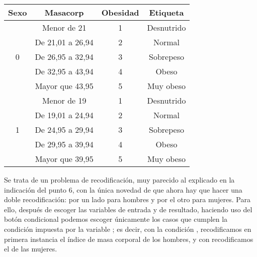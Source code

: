 \documentclass[a4paper]{article}
\begin{document}
\begin{enumerate}
\begin{center}
\begin{tabular}{|l|l|l|l|}
\hline
\multicolumn{1}{|c|}{Sexo} & \multicolumn{1}{c|}{Masacorp} & \multicolumn{1}{c|}{Obesidad} & \multicolumn{1}{c|}{Etiqueta} \\
\hline
\multicolumn{1}{|c|}{} & \multicolumn{1}{c|}{Menor de 21} & \multicolumn{1}{c|}{1} & \multicolumn{1}{c|}{Desnutrido} \\
\cline{2-4}
\multicolumn{1}{|c|}{} & \multicolumn{1}{c|}{De 21,01 a 26,94} & \multicolumn{1}{c|}{2} & \multicolumn{1}{c|}{Normal} \\
\cline{2-4}
\multicolumn{1}{|c|}{0} & \multicolumn{1}{c|}{De 26,95 a 32,94} & \multicolumn{1}{c|}{3} & \multicolumn{1}{c|}{Sobrepeso} \\
\cline{2-4}
\multicolumn{1}{|c|}{} & \multicolumn{1}{c|}{De 32,95 a 43,94} & \multicolumn{1}{c|}{4} & \multicolumn{1}{c|}{Obeso} \\
\cline{2-4}
\multicolumn{1}{|c|}{} & \multicolumn{1}{c|}{Mayor que 43,95} & \multicolumn{1}{c|}{5} & \multicolumn{1}{c|}{Muy obeso} \\
\hline
\multicolumn{1}{|c|}{} & \multicolumn{1}{c|}{Menor de 19} & \multicolumn{1}{c|}{1} & \multicolumn{1}{c|}{Desnutrido} \\
\cline{2-4}
\multicolumn{1}{|c|}{} & \multicolumn{1}{c|}{De 19,01 a 24,94} & \multicolumn{1}{c|}{2} & \multicolumn{1}{c|}{Normal} \\
\cline{2-4}
\multicolumn{1}{|c|}{1} & \multicolumn{1}{c|}{De 24,95 a 29,94} & \multicolumn{1}{c|}{3} & \multicolumn{1}{c|}{Sobrepeso} \\
\cline{2-4}
\multicolumn{1}{|c|}{} & \multicolumn{1}{c|}{De 29,95 a 39,94} & \multicolumn{1}{c|}{4} & \multicolumn{1}{c|}{Obeso} \\
\cline{2-4}
\multicolumn{1}{|c|}{} & \multicolumn{1}{c|}{Mayor que 39,95} & \multicolumn{1}{c|}{5} & \multicolumn{1}{c|}{Muy obeso} \\
\hline
\end{tabular}

\begin{indicacion}{
Se trata de un problema de recodificación, muy parecido al explicado
en la indicación del punto 6, con la única novedad de que ahora hay
que hacer una doble recodificación: por un lado para hombres y por
el otro para mujeres. Para ello, después de escoger las variables de
entrada y de resultado, haciendo uso del botón condicional
 podemos escoger únicamente los casos que cumplen la
condición impuesta por la variable ; es decir, con la
condición , recodificamos en primera instancia el
índice de masa corporal de los hombres, y con 
recodificamos el de las mujeres.

}
\end{indicacion}

\end{center}



\end{enumerate}
\end{document}
